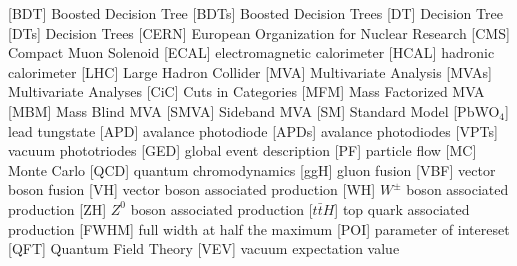 \begin{acronym}[AAAAAA]
 [BDT] {Boosted Decision Tree}
 [BDTs] {Boosted Decision Trees}
 [DT] {Decision Tree}
 [DTs] {Decision Trees}
 [CERN] {European Organization for Nuclear Research}
 [CMS] {Compact Muon Solenoid}
 [ECAL] {electromagnetic calorimeter}
 [HCAL] {hadronic calorimeter}
 [LHC] {Large Hadron Collider}
 [MVA] {Multivariate Analysis}
 [MVAs] {Multivariate Analyses}
 [CiC] {Cuts in Categories}
 [MFM] {Mass Factorized MVA}
 [MBM] {Mass Blind MVA}
 [SMVA] {Sideband MVA}
 [SM] {Standard Model}
 [PbWO$_{4}$] {lead tungstate}
 [APD] {avalance photodiode}
 [APDs] {avalance photodiodes}
 [VPTs] {vacuum phototriodes}
 [GED] {global event description}
 [PF] {particle flow}
 [MC] {Monte Carlo}
 [QCD] {quantum chromodynamics}
 [ggH] {gluon fusion}
 [VBF] {vector boson fusion}
 [VH] {vector boson associated production}
 [WH] {$W^{\pm}$ boson associated production}
 [ZH] {$Z^{0}$ boson associated production}
 [$t\bar{t}H$] {top quark associated production}
 [FWHM] {full width at half the maximum}
 [POI] {parameter of intereset}
 [QFT] {Quantum Field Theory}
 [VEV] {vacuum expectation value}
\end{acronym}




